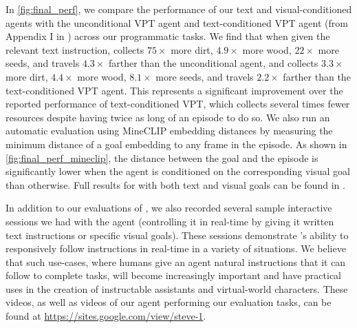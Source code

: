 In \autoref{fig:final_perf}, we compare the performance of our text and visual-conditioned agents with the unconditional VPT agent and text-conditioned VPT agent (from Appendix I in \citep{baker2022vpt}) across our programmatic tasks. We find that when given the relevant text instruction, \agentname{} collects \(75 \times\) more dirt, \(4.9 \times\) more wood, \(22 \times\) more seeds, and travels \(4.3 \times\) farther than the unconditional agent, and \agentname{} collects \(3.3 \times\) more dirt, \(4.4 \times\) more wood, \(8.1 \times\) more seeds, and travels \(2.2 \times\) farther than the text-conditioned VPT agent. This represents a significant improvement over the reported performance of text-conditioned VPT, which collects several times fewer resources despite having twice as long of an episode to do so. We also run an automatic evaluation using MineCLIP embedding distances by measuring the minimum distance of a goal embedding to any frame in the episode. As shown in \autoref{fig:final_perf_mineclip}, the distance between the goal and the episode is significantly lower when the agent is conditioned on the corresponding visual goal than otherwise. Full results for \agentname{} with both text and visual goals can be found in .

In addition to our evaluations of \agentname{}, we also recorded several sample interactive sessions we had with the agent (controlling it in real-time by giving it written text instructions or specific visual goals). These sessions demonstrate \agentname{}'s ability to responsively follow instructions in real-time in a variety of situations. We believe that such use-cases, where humans give an agent natural instructions that it can follow to complete tasks, will become increasingly important and have practical uses in the creation of instructable assistants and virtual-world characters. These videos, as well as videos of our agent performing our evaluation tasks, can be found at \href{https://sites.google.com/view/steve-1}{https://sites.google.com/view/steve-1}.

